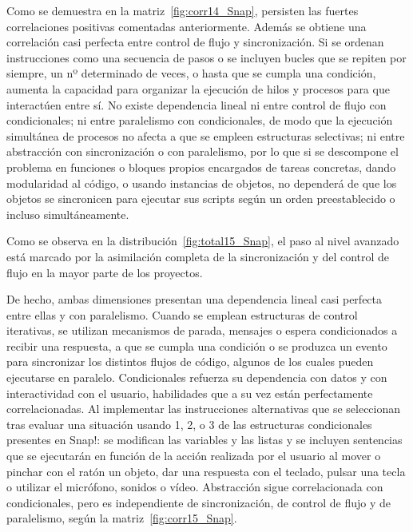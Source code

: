 \documentclass[a4paper, 12pt]{book}
\begin{document}
Como se demuestra en la matriz~\ref{fig:corr14_Snap}, persisten las fuertes correlaciones positivas comentadas anteriormente. Además se obtiene una correlación casi perfecta entre control de flujo y sincronización. Si se ordenan instrucciones como una secuencia de pasos o se incluyen bucles que se repiten por siempre, un nº determinado de veces, o hasta que se cumpla una condición, aumenta la capacidad para organizar la ejecución de hilos y procesos para que interactúen entre sí. No existe dependencia lineal ni entre control de flujo con condicionales; ni entre paralelismo con condicionales, de modo que la ejecución simultánea de procesos no afecta a que se empleen estructuras selectivas; ni entre abstracción con sincronización o con paralelismo, por lo que si se descompone el problema en funciones o bloques propios encargados de tareas concretas, dando modularidad al código, o usando instancias de objetos, no dependerá de que los objetos se sincronicen para ejecutar sus scripts según un orden preestablecido o incluso simultáneamente.

Como se observa en la distribución~\ref{fig:total15_Snap}, el paso al nivel avanzado está marcado por la asimilación completa de la sincronización y del control de flujo en la mayor parte de los proyectos.   

De hecho, ambas dimensiones presentan una dependencia lineal casi perfecta entre ellas y con paralelismo. Cuando se emplean estructuras de control iterativas, se utilizan mecanismos de parada, mensajes o espera condicionados a recibir una respuesta, a que se cumpla una condición o se produzca un evento para sincronizar los distintos flujos de código, algunos de los cuales pueden ejecutarse en paralelo.
Condicionales refuerza su dependencia con datos y con interactividad con el usuario, habilidades que a su vez están perfectamente correlacionadas. Al implementar las instrucciones alternativas que se seleccionan tras evaluar una situación usando 1, 2, o 3 de las estructuras condicionales presentes en Snap!: se modifican las variables y las listas y se incluyen sentencias que se ejecutarán en función de la acción realizada por el usuario al mover o pinchar con el ratón un objeto, dar una respuesta con el teclado, pulsar una tecla o utilizar el micrófono, sonidos o vídeo. Abstracción sigue correlacionada con condicionales, pero es independiente de sincronización, de control de flujo y de paralelismo, según la matriz~\ref{fig:corr15_Snap}.
\end{document}
